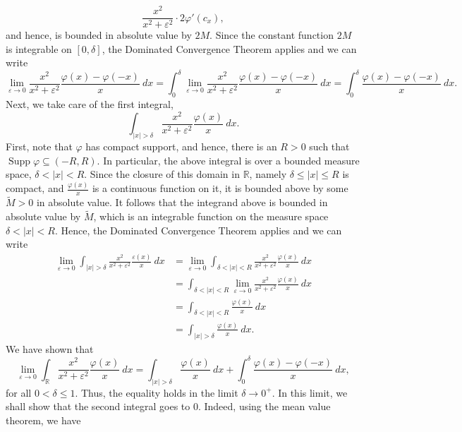 \documentclass[10pt]{amsart}
\theoremstyle{thmstyle}
\theoremstyle{defstyle}
\newcommand{\R}{\mathbb{R}}
\newcommand{\Supp}{\operatorname{Supp}}
\newcommand{\wt}[1]{\widetilde{#1}}
\renewcommand{\le}{\leqslant}
\begin{document}
\begin{equation*}
	\frac{x^2}{x^2 + \varepsilon^2}\cdot 2\varphi'(c_x),
\end{equation*}
and hence, is bounded in absolute value by $2M$. Since the constant function $2M$ is integrable on $[0,\delta]$, the Dominated Convergence Theorem applies and we can write 
\begin{equation*}
	\lim_{\varepsilon\to 0}\frac{x^2}{x^2 + \varepsilon^2}\frac{\varphi(x) - \varphi(-x)}{x}~dx = \int_{0}^\delta\lim_{\varepsilon\to 0}\frac{x^2}{x^2 + \varepsilon^2}\frac{\varphi(x) - \varphi(-x)}{x}~dx = \int_0^\delta\frac{\varphi(x) - \varphi(-x)}{x}~dx.
\end{equation*}
Next, we take care of the first integral, 
\begin{equation*}
	\int_{|x| > \delta}\frac{x^2}{x^2 + \varepsilon^2}\frac{\varphi(x)}{x}~dx.
\end{equation*}
First, note that $\varphi$ has compact support, and hence, there is an $R > 0$ such that $\Supp\varphi\subseteq(-R, R)$. In particular, the above integral is over a bounded measure space, $\delta < |x| < R$. Since the closure of this domain in $\R$, namely $\delta\le|x|\le R$ is compact, and $\frac{\varphi(x)}{x}$ is a continuous function on it, it is bounded above by some $\wt M > 0$ in absolute value. It follows that the integrand above is bounded in absolute value by $\wt M$, which is an integrable function on the measure space $\delta < |x| < R$. Hence, the Dominated Convergence Theorem applies and we can write 
\begin{align*}
	\lim_{\varepsilon\to 0}\int_{|x| > \delta}\frac{x^2}{x^2 + \varepsilon^2}\frac{\varepsilon(x)}{x}~dx &= \lim_{\varepsilon\to 0}\int_{\delta < |x| < R}\frac{x^2}{x^2 + \varepsilon^2}\frac{\varphi(x)}{x}~dx\\
	&= \int_{\delta < |x| < R}\lim_{\varepsilon\to 0}\frac{x^2}{x^2 + \varepsilon^2}\frac{\varphi(x)}{x}~dx\\
	&= \int_{\delta < |x| < R}\frac{\varphi(x)}{x}~dx\\
	&= \int_{|x| > \delta}\frac{\varphi(x)}{x}~dx.
\end{align*}
We have shown that 
\begin{equation*}
	\lim_{\varepsilon\to 0}\int_{\R}\frac{x^2}{x^2 + \varepsilon^2}\frac{\varphi(x)}{x}~dx = \int_{|x| > \delta}\frac{\varphi(x)}{x}~dx + \int_{0}^\delta\frac{\varphi(x) - \varphi(-x)}{x}~dx,
\end{equation*}
for all $0 < \delta\le 1$. Thus, the equality holds in the limit $\delta\to 0^+$. In this limit, we shall show that the second integral goes to $0$. Indeed, using the mean value theorem, we have 
\end{document}
